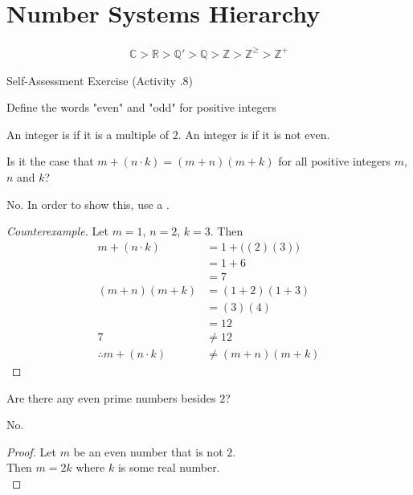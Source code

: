\documentclass[\main/notes.tex]{subfiles}
\begin{document}
		\section{Number Systems Hierarchy}
			\begin{align*}
				\mathbb{C} > \mathbb{R} > \mathbb{Q}' > \mathbb{Q} > \mathbb{Z} > \mathbb{Z}^{\geq} > \mathbb{Z}^{+}
			\end{align*}
			\pagebreak
			\begin{exercise}{Self-Assessment Exercise (Activity \thechapter.8)}
				\begin{questions}
					\item Define the words "even" and "odd" for positive integers\\
						\begin{answer}
							An integer is  if it is a multiple of $2$. An integer is  if it is not even.
						\end{answer}
					\item Is it the case that $m + (n\cdot k) = (m + n)(m + k)$ for all positive integers $m$, $n$ and $k$? \\
						\begin{answer}
							No. In order to show this, use a \concept{counterexample}.
							\begin{proof}[Counterexample]
								Let $m = 1$, $n = 2$, $k = 3$. Then
								\begin{align*}
									m + (n \cdot k) &= 1 + \bigl((2)(3)\bigr)\\
									&= 1 + 6\\
									&= 7\\
									(m + n)(m + k) &= (1 + 2)(1 + 3)\\
									&= (3)(4)\\
									&= 12\\
									7 &\neq 12\\
									\therefore m + (n \cdot k) &\neq (m + n)(m + k)
								\end{align*}
							\end{proof}
						\end{answer}
					\item Are there any even prime numbers besides $2$?\\
						\begin{answer}
							No.
							\begin{proof}
								Let $m$ be an even number that is not $2$.\\
								Then $m = 2k$ where $k$ is some real number.\\

\end{proof}
\end{answer}
\end{questions}
\end{exercise}
\end{document}
